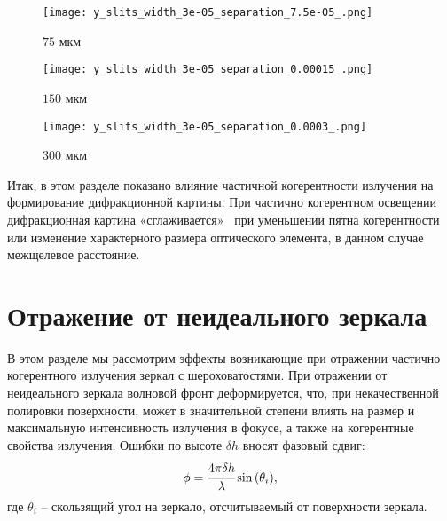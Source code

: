 \begin{figure}[H]
	\centering
	\begin{minipage}{0.33\textwidth}
		\centering
		\texttt{[image: y\_slits\_width\_3e-05\_separation\_7.5e-05\_.png]}
		\caption{$75$ мкм}
		\label{fig:y_slits_75}
	\end{minipage}
	\begin{minipage}{0.33\textwidth}
		\centering
		\texttt{[image: y\_slits\_width\_3e-05\_separation\_0.00015\_.png]}
		\caption{$150$ мкм}
		\label{fig:y_slits_150}
	\end{minipage}\hfill
	\begin{minipage}{0.33\textwidth}
		\centering
		\texttt{[image: y\_slits\_width\_3e-05\_separation\_0.0003\_.png]}
		\caption{$300$ мкм}
		\label{fig:y_slits_300}
\end{minipage}\hfill
\end{figure}
Итак, в этом разделе показано влияние частичной когерентности излучения на формирование дифракционной картины. При частично когерентном освещении дифракционная картина «сглаживается»~\cite{goodman_statistical_2015} при уменьшении пятна когерентности или изменение характерного размера оптического элемента, в данном случае межщелевое расстояние. 

\section{Отражение от неидеального зеркала}
В этом разделе мы рассмотрим эффекты возникающие при отражении частично когерентного излучения зеркал с шероховатостями. При отражении от неидеального зеркала волновой фронт деформируется, что, при некачественной полировки поверхности, может в значительной степени влиять на размер и максимальную интенсивность излучения в фокусе, а также на когерентные свойства излучения. Ошибки по высоте $\delta h$ вносят фазовый сдвиг: 
\begin{align}
	\phi = \cfrac{4 \pi \delta h}{\lambda} \sin{(\theta_i)},
	\label{eq:roughness}
\end{align}
где $\theta_i$ -- скользящий угол на зеркало, отсчитываемый от поверхности зеркала. 

